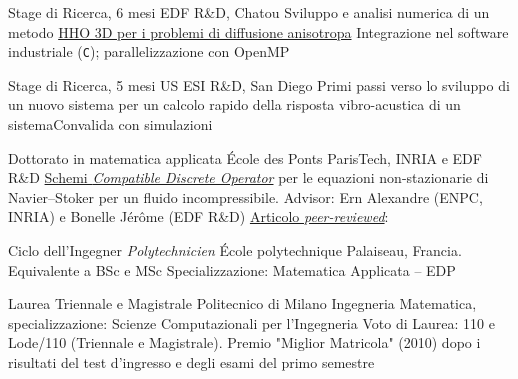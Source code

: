 \documentclass[italian]{RMcv}
\begin{document}
%
%
        {Stage di Ricerca, 6 mesi}%
        {EDF R\&D, Chatou}%
        {Sviluppo e analisi numerica di un metodo \href{\tesilink}{HHO 3D per i problemi di diffusione anisotropa}}%
        {Integrazione nel software industriale \cs{} (\texttt{C}); parallelizzazione con OpenMP}


%
%
        {Stage di Ricerca, 5 mesi}%
        {US ESI R\&D, San Diego}%
        {Primi passi verso lo sviluppo di un nuovo sistema per un calcolo rapido della risposta vibro-acustica di un sistema}{Convalida con simulazioni}


%

\vspace{8pt}


%
        {Dottorato in matematica applicata}%
        {\'Ecole des Ponts ParisTech, INRIA e EDF R\&D}%
        {\href{\PhDlink}{Schemi \emph{Compatible Discrete Operator}} per le equazioni non-stazionarie di Navier--Stoker per un fluido incompressibile. Advisor: Ern Alexandre (ENPC, INRIA) e Bonelle J\'er\^ome (EDF R\&D)}%
        {\href{\articlelink}{Articolo \emph{peer-reviewed}}: \article{}}%



%
%
        {Ciclo dell'Ingegner \textit{Polytechnicien}}%
        {École polytechnique}%
        {Palaiseau, Francia. Equivalente a BSc e MSc}%
        {Specializzazione: Matematica Applicata -- EDP}


%
%
        {Laurea Triennale e Magistrale}%
        {Politecnico di Milano}%
        {Ingegneria Matematica, specializzazione: Scienze Computazionali per l'Ingegneria}%
        {Voto di Laurea: 110 e Lode/110 (Triennale e Magistrale). Premio "Miglior Matricola" (2010) dopo i risultati del test d'ingresso e degli esami del primo semestre}
\end{document}
